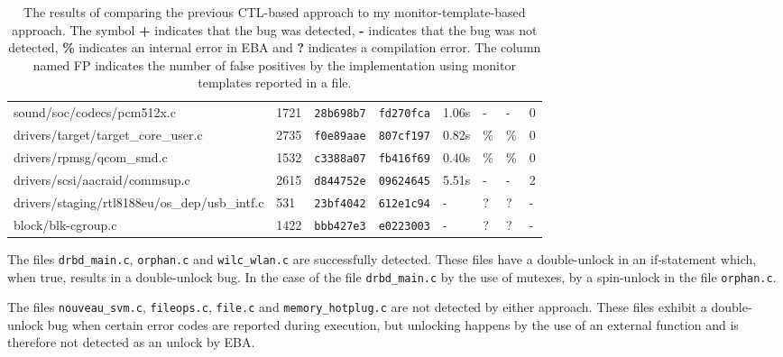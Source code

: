 \begin{table}[H]
\begin{tabular}{llllllll}
    sound/soc/codecs/pcm512x.c                    & 1721           & \texttt{28b698b7}   & \texttt{fd270fca}   & 1.06s         & -             & -            & 0           \\
    drivers/target/target\_core\_user.c           & 2735           & \texttt{f0e89aae}   & \texttt{807cf197}   & 0.82s         & \%            & \%           & 0           \\
    drivers/rpmsg/qcom\_smd.c                     & 1532           & \texttt{c3388a07}   & \texttt{fb416f69}   & 0.40s         & \%            & \%           & 0           \\
    drivers/scsi/aacraid/commsup.c                & 2615           & \texttt{d844752e}   & \texttt{09624645}   & 5.51s         & -             & -            & 2           \\
    drivers/staging/rtl8188eu/os\_dep/usb\_intf.c & 531            & \texttt{23bf4042}   & \texttt{612e1c94}   & -             & ?             & ?            & -           \\
    block/blk-cgroup.c                            & 1422           & \texttt{bbb427e3}   & \texttt{e0223003}   & -             & ?             & ?            & -           
    \end{tabular}
    \caption{The results of comparing the previous CTL-based approach to my monitor-template-based approach. The symbol \textbf{+} indicates that the bug was detected, \textbf{-} indicates that the bug was not detected, \textbf{\%} indicates an internal error in EBA and \textbf{?} indicates a compilation error. The column named FP indicates the number of false positives by the implementation using monitor templates reported in a file.}
    \label{evaluation-table}
\end{table}

\newpar The files \texttt{drbd\_main.c}, \texttt{orphan.c} and \texttt{wilc\_wlan.c} are successfully detected. These files have a double-unlock in an if-statement which, when true, results in a double-unlock bug. In the case of the file \texttt{drbd\_main.c} by the use of mutexes, by a spin-unlock in the file \texttt{orphan.c}. 

\newpar The files \texttt{nouveau\_svm.c}, \texttt{fileops.c}, \texttt{file.c} and \texttt{memory\_hotplug.c} are not detected by either approach. These files exhibit a double-unlock bug when certain error codes are reported during execution, but unlocking happens by the use of an external function and is therefore not detected as an unlock by EBA.

